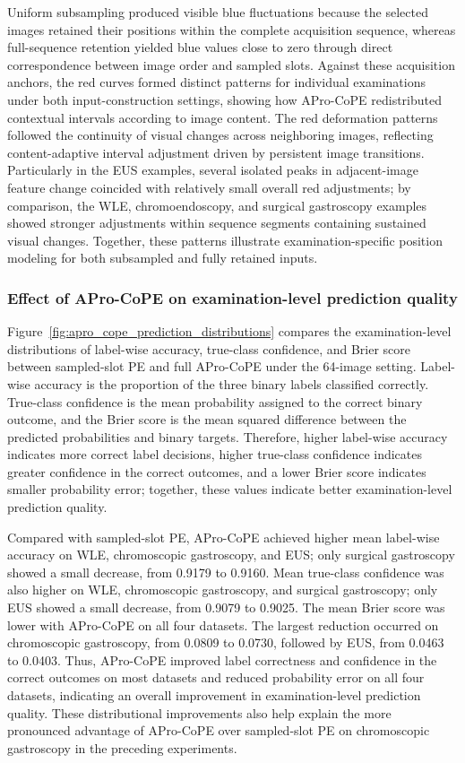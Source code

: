 \documentclass[Afour,sagev,times]{sagej}
\begin{document}
Uniform subsampling produced visible blue fluctuations because the selected images retained their positions within the complete acquisition sequence, whereas full-sequence retention yielded blue values close to zero through direct correspondence between image order and sampled slots. Against these acquisition anchors, the red curves formed distinct patterns for individual examinations under both input-construction settings, showing how APro-CoPE redistributed contextual intervals according to image content. The red deformation patterns followed the continuity of visual changes across neighboring images, reflecting content-adaptive interval adjustment driven by persistent image transitions. Particularly in the EUS examples, several isolated peaks in adjacent-image feature change coincided with relatively small overall red adjustments; by comparison, the WLE, chromoendoscopy, and surgical gastroscopy examples showed stronger adjustments within sequence segments containing sustained visual changes. Together, these patterns illustrate examination-specific position modeling for both subsampled and fully retained inputs.

\subsubsection{Effect of APro-CoPE on examination-level prediction quality}

Figure~\ref{fig:apro_cope_prediction_distributions} compares the examination-level distributions of label-wise accuracy, true-class confidence, and Brier score between sampled-slot PE and full APro-CoPE under the 64-image setting. Label-wise accuracy is the proportion of the three binary labels classified correctly. True-class confidence is the mean probability assigned to the correct binary outcome, and the Brier score is the mean squared difference between the predicted probabilities and binary targets. Therefore, higher label-wise accuracy indicates more correct label decisions, higher true-class confidence indicates greater confidence in the correct outcomes, and a lower Brier score indicates smaller probability error; together, these values indicate better examination-level prediction quality.

Compared with sampled-slot PE, APro-CoPE achieved higher mean label-wise accuracy on WLE, chromoscopic gastroscopy, and EUS; only surgical gastroscopy showed a small decrease, from 0.9179 to 0.9160. Mean true-class confidence was also higher on WLE, chromoscopic gastroscopy, and surgical gastroscopy; only EUS showed a small decrease, from 0.9079 to 0.9025. The mean Brier score was lower with APro-CoPE on all four datasets. The largest reduction occurred on chromoscopic gastroscopy, from 0.0809 to 0.0730, followed by EUS, from 0.0463 to 0.0403. Thus, APro-CoPE improved label correctness and confidence in the correct outcomes on most datasets and reduced probability error on all four datasets, indicating an overall improvement in examination-level prediction quality. These distributional improvements also help explain the more pronounced advantage of APro-CoPE over sampled-slot PE on chromoscopic gastroscopy in the preceding experiments.
\end{document}
